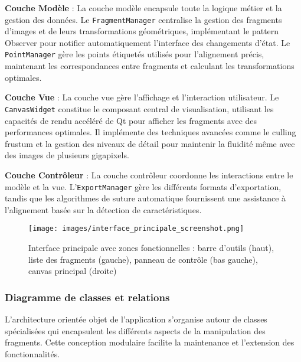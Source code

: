 \textbf{Couche Modèle} : La couche modèle encapsule toute la logique métier et la gestion des données. Le \texttt{FragmentManager} centralise la gestion des fragments d'images et de leurs transformations géométriques, implémentant le pattern Observer pour notifier automatiquement l'interface des changements d'état. Le \texttt{PointManager} gère les points étiquetés utilisés pour l'alignement précis, maintenant les correspondances entre fragments et calculant les transformations optimales.

\textbf{Couche Vue} : La couche vue gère l'affichage et l'interaction utilisateur. Le \texttt{CanvasWidget} constitue le composant central de visualisation, utilisant les capacités de rendu accéléré de Qt pour afficher les fragments avec des performances optimales. Il implémente des techniques avancées comme le culling frustum et la gestion des niveaux de détail pour maintenir la fluidité même avec des images de plusieurs gigapixels.

\textbf{Couche Contrôleur} : La couche contrôleur coordonne les interactions entre le modèle et la vue. L'\texttt{ExportManager} gère les différents formats d'exportation, tandis que les algorithmes de suture automatique fournissent une assistance à l'alignement basée sur la détection de caractéristiques.

\begin{figure}[H]
\centering
\texttt{[image: images/interface\_principale\_screenshot.png]}
\caption{Interface principale avec zones fonctionnelles : barre d'outils (haut), liste des fragments (gauche), panneau de contrôle (bas gauche), canvas principal (droite)}
\label{fig:interface_principale}
\end{figure}

\subsubsection{Diagramme de classes et relations}

L'architecture orientée objet de l'application s'organise autour de classes spécialisées qui encapsulent les différents aspects de la manipulation des fragments. Cette conception modulaire facilite la maintenance et l'extension des fonctionnalités.

